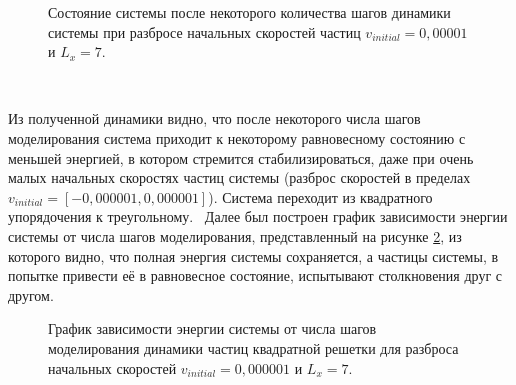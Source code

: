 \documentclass[14pt,a4paper,report]{ncc}
\begin{document}
\begin{figure}[]
\caption{Состояние системы после некоторого количества шагов динамики системы при разбросе начальных скоростей частиц $v_{initial} = 0,00001 $ и  $L_x=7$.}
\label{ris:image7}
\end{figure}
\

Из полученной динамики видно, что после некоторого числа шагов моделирования система приходит к некоторому равновесному состоянию с меньшей энергией, в котором стремится стабилизироваться, даже при очень малых начальных скоростях частиц системы (разброс скоростей в пределах $v_{initial} = [-0,000001, 0,000001] $). Система переходит из квадратного упорядочения к треугольному.
\
Далее был построен график зависимости энергии системы от числа шагов моделирования, представленный на рисунке \ref{ris:image8}, из которого видно, что полная энергия системы сохраняется, а частицы системы, в попытке привести её в равновесное состояние, испытывают столкновения друг с другом.
\

\begin{figure}[]
\caption{График зависимости энергии системы от числа шагов моделирования динамики частиц квадратной решетки для разброса начальных скоростей $v_{initial} = 0,000001 $ и  $L_x=7$.}
\label{ris:image8}
\end{figure}
\
\end{document}
